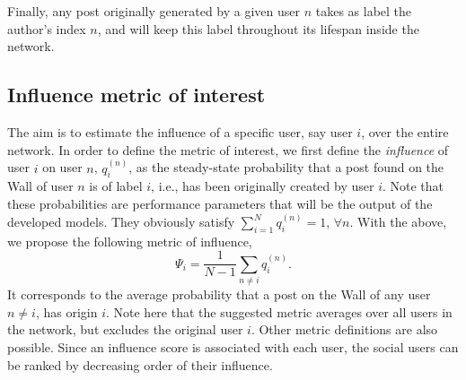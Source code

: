 \documentclass[10pt, conference, letterpaper]{IEEEtran}
\begin{document}

Finally, any post originally generated by a given user $n$ takes as label the author's index $n$, and will keep this label throughout its lifespan inside the network.

\subsection{Influence metric of interest}
\label{metrics}

The aim is to estimate the influence of a specific user, say user $i$, over the entire network. In order to define the metric of interest, we first define the \textit{influence} of user $i$ on user $n$, $q_i^{(n)}$, as the steady-state probability that a post found on the Wall of user $n$ is of label $i$, i.e., has been originally created by user $i$. Note that these probabilities are performance parameters that will be the output of the developed models. They obviously satisfy $\sum_{i=1}^{N}q_i^{(n)}=1$, $\forall n$. With the above, we propose the following metric of influence,%
\begin{equation}
\label{aim1}
\Psi_i = \frac{1}{N-1} \sum_{n \neq i} q_i^{(n)}.
\end{equation}
It corresponds to the average probability that a post on the Wall of any user $n\neq i$, has origin $i$. Note here that the suggested metric averages over all users in the network, but excludes the original user $i$. Other metric definitions are also possible. Since an influence score is associated with each user, the social users can be ranked by decreasing order of their influence.
%
\end{document}
